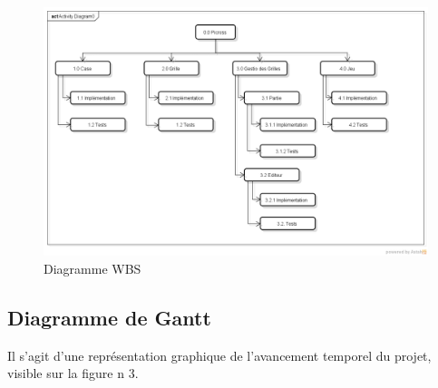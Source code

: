 \documentclass[11pt]{article}
\begin{document}
\begin{figure}[!ht]
		\centering
		\includegraphics[width=18cm]{./Diagrammes/Diagramme_WBS/WBS.png}
		\caption{Diagramme WBS}
\end{figure}

\newpage
\subsection{Diagramme de Gantt}
Il s'agit d'une représentation graphique de l'avancement temporel du projet, visible sur la figure n 3.
\end{document}
